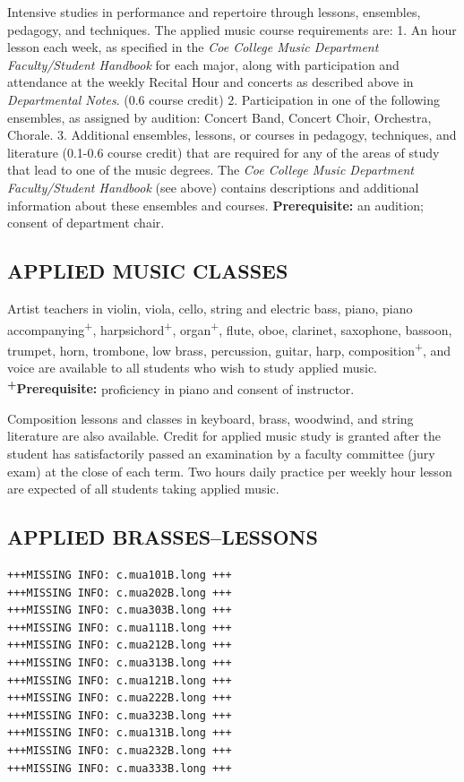 \documentclass[
  letterpaper,
]{scrbook}
\begin{document}
Intensive studies in performance and repertoire through lessons,
ensembles, pedagogy, and techniques. The applied music course
requirements are: 1. An hour lesson each week, as specified in the
\emph{Coe College Music Department Faculty/Student Handbook} for each
major, along with participation and attendance at the weekly Recital
Hour and concerts as described above in \emph{Departmental Notes}. (0.6
course credit) 2. Participation in one of the following ensembles, as
assigned by audition: Concert Band, Concert Choir, Orchestra, Chorale.
3. Additional ensembles, lessons, or courses in pedagogy, techniques,
and literature (0.1-0.6 course credit) that are required for any of the
areas of study that lead to one of the music degrees. The \emph{Coe
College Music Department Faculty/Student Handbook} (see above) contains
descriptions and additional information about these ensembles and
courses. \textbf{Prerequisite:} an audition; consent of department
chair.

\hypertarget{applied-music-classes}{%
\subsection{APPLIED MUSIC CLASSES}\label{applied-music-classes}}

Artist teachers in violin, viola, cello, string and electric bass,
piano, piano accompanying\textsuperscript{+},
harpsichord\textsuperscript{+}, organ\textsuperscript{+}, flute, oboe,
clarinet, saxophone, bassoon, trumpet, horn, trombone, low brass,
percussion, guitar, harp, composition\textsuperscript{+}, and voice are
available to all students who wish to study applied music.
\textbf{\textsuperscript{+}Prerequisite:} proficiency in piano and
consent of instructor.

Composition lessons and classes in keyboard, brass, woodwind, and string
literature are also available. Credit for applied music study is granted
after the student has satisfactorily passed an examination by a faculty
committee (jury exam) at the close of each term. Two hours daily
practice per weekly hour lesson are expected of all students taking
applied music.

\hypertarget{applied-brasseslessons}{%
\subsection{APPLIED BRASSES--LESSONS}\label{applied-brasseslessons}}

\begin{verbatim}
+++MISSING INFO: c.mua101B.long +++
+++MISSING INFO: c.mua202B.long +++
+++MISSING INFO: c.mua303B.long +++
+++MISSING INFO: c.mua111B.long +++
+++MISSING INFO: c.mua212B.long +++
+++MISSING INFO: c.mua313B.long +++
+++MISSING INFO: c.mua121B.long +++
+++MISSING INFO: c.mua222B.long +++
+++MISSING INFO: c.mua323B.long +++
+++MISSING INFO: c.mua131B.long +++
+++MISSING INFO: c.mua232B.long +++
+++MISSING INFO: c.mua333B.long +++
\end{verbatim}
\end{document}
